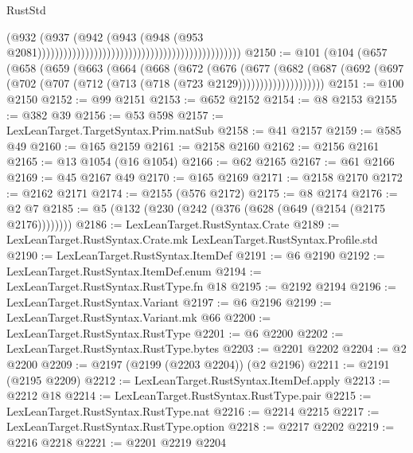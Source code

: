 \begin{lexlean}{RustStd}
\begin{coremodule}
                                                                                      (@932
                                                                                        (@937
                                                                                          (@942
                                                                                            (@943
                                                                                              (@948
                                                                                                (@953
                                                                                                  @2081)))))))))))))))))))))))))))))))))))))))))))))))
@2150 := @101
    (@104
      (@657
        (@658
          (@659
            (@663
              (@664
                (@668
                  (@672
                    (@676
                      (@677
                        (@682
                          (@687
                            (@692
                              (@697 (@702 (@707 (@712 (@713 (@718 (@723 @2129))))))))))))))))))))
@2151 := @100 @2150
@2152 := @99 @2151
@2153 := @652 @2152
@2154 := @8 @2153
@2155 := @382 @39
@2156 := @53 @598
@2157 := LexLeanTarget.TargetSyntax.Prim.natSub
@2158 := @41 @2157
@2159 := @585 @49
@2160 := @165 @2159
@2161 := @2158 @2160
@2162 := @2156 @2161
@2165 := @13 @1054 (@16 @1054)
@2166 := @62 @2165
@2167 := @61 @2166
@2169 := @45 @2167 @49
@2170 := @165 @2169
@2171 := @2158 @2170
@2172 := @2162 @2171
@2174 := @2155 (@576 @2172)
@2175 := @8 @2174
@2176 := @2 @7
@2185 := @5 (@132 (@230 (@242 (@376 (@628 (@649 (@2154 (@2175 @2176))))))))
@2186 := LexLeanTarget.RustSyntax.Crate
@2189 := LexLeanTarget.RustSyntax.Crate.mk LexLeanTarget.RustSyntax.Profile.std
@2190 := LexLeanTarget.RustSyntax.ItemDef
@2191 := @6 @2190
@2192 := LexLeanTarget.RustSyntax.ItemDef.enum
@2194 := LexLeanTarget.RustSyntax.RustType.fn @18
@2195 := @2192 @2194
@2196 := LexLeanTarget.RustSyntax.Variant
@2197 := @6 @2196
@2199 := LexLeanTarget.RustSyntax.Variant.mk @66
@2200 := LexLeanTarget.RustSyntax.RustType
@2201 := @6 @2200
@2202 := LexLeanTarget.RustSyntax.RustType.bytes
@2203 := @2201 @2202
@2204 := @2 @2200
@2209 := @2197 (@2199 (@2203 @2204)) (@2 @2196)
@2211 := @2191 (@2195 @2209)
@2212 := LexLeanTarget.RustSyntax.ItemDef.apply
@2213 := @2212 @18
@2214 := LexLeanTarget.RustSyntax.RustType.pair
@2215 := LexLeanTarget.RustSyntax.RustType.nat
@2216 := @2214 @2215
@2217 := LexLeanTarget.RustSyntax.RustType.option
@2218 := @2217 @2202
@2219 := @2216 @2218
@2221 := @2201 @2219 @2204

\end{coremodule}
\end{lexlean}
